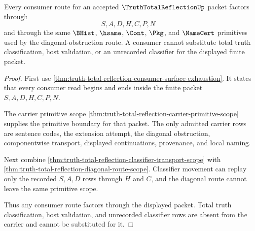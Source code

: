 \begin{theorem}
\label{thm:truth-total-reflection-consumer-route-scope}
Every consumer route for an accepted $\TruthTotalReflectionUp$ packet factors through
$$
S,A,D,H,C,P,N
$$
and through the same $\BHist$, $\hsame$, $\Cont$, $\Pkg$, and $\NameCert$ primitives used by the diagonal-obstruction route. A consumer cannot substitute total truth classification, host validation, or an unrecorded classifier for the displayed finite packet.
\end{theorem}
\begin{proof}
First use \autoref{thm:truth-total-reflection-consumer-surface-exhaustion}. It states that every consumer read begins and ends inside the finite packet $S,A,D,H,C,P,N$.

The carrier primitive scope \autoref{thm:truth-total-reflection-carrier-primitive-scope} supplies the primitive boundary for that packet. The only admitted carrier rows are sentence codes, the extension attempt, the diagonal obstruction, componentwise transport, displayed continuations, provenance, and local naming.

Next combine \autoref{thm:truth-total-reflection-classifier-transport-scope} with \autoref{thm:truth-total-reflection-diagonal-route-scope}. Classifier movement can replay only the recorded $S,A,D$ rows through $H$ and $C$, and the diagonal route cannot leave the same primitive scope.

Thus any consumer route factors through the displayed packet. Total truth classification, host validation, and unrecorded classifier rows are absent from the carrier and cannot be substituted for it.
\end{proof}

